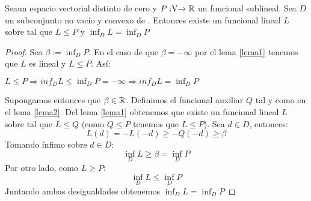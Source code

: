 	\begin{teoremaBox}
		Sea\vecSpace un espacio vectorial distinto de cero y $P:\vecSpace \rightarrow \RR$ un funcional sublineal.  Sea $ D $ un subconjunto no vacío y convexo de \vecSpace. Entonces existe un funcional lineal $ L $ sobre \vecSpace tal que $ L \leq P $ y $ \inf_D L = \inf_D P $
	\end{teoremaBox}
	\begin{proof}
		Sea $ \beta := \inf_D P $. En el caso de que $ \beta = -\infty $ por el lema \ref{lema1} tenemos que $ L $ es lineal y $ L \leq P$. Así:
		\begin{center}
			$ L \leq P \Longrightarrow inf_D L \leq \inf_D P = -\infty \Longrightarrow inf_D L = \inf_D P$ 
		\end{center}
		
		Supongamos entonces que $ \beta \in \mathbb{R} $. Definimos el funcional auxiliar $ Q $ tal y como en el lema \ref{lema2}. Del lema \ref{lema1} obtenemos que existe un funcional lineal $ L $ sobre \vecSpace tal que $ L \leq Q$ (como $ Q \leq P $ tenemos que $ L \leq P $). Sea $ d \in D $, entonces:
		\[
		L(d) = -L(-d) \geq -Q(-d) \geq \beta
		\]
		Tomando ínfimo sobre $ d \in D $:
		\[
		\inf_D L \geq \beta = \inf_D P
		\]
		Por otro lado, como $ L \geq P $:
		\[
		\inf_D L \leq\inf_D P
		\]
		Juntando ambas desigualdades obtenemos $ \inf_D L =\inf_D P $
	\end{proof}
	
